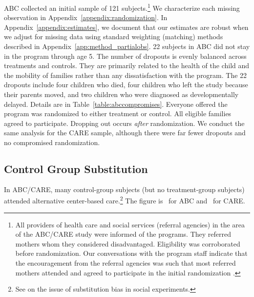 ABC collected an initial sample of 121 subjects.\footnote{All providers of health care and social services (referral agencies) in the area of the ABC/CARE study were informed of the programs. They referred mothers whom they considered disadvantaged. Eligibility was corroborated before randomization. Our conversations with the program staff indicate that the encouragement from the referral agencies was such that most referred mothers attended and agreed to participate in the initial randomization \citep{Ramey-etal_2012-ABC}.} We characterize each missing observation in Appendix~\ref{appendix:randomization}. In Appendix~\ref{appendix:estimates}, we document that our estimates are robust when we adjust for missing data using standard weighting (matching) methods described in Appendix~\ref{app:method_partialobs}. 22 subjects in ABC did not stay in the program through age 5. The number of dropouts is evenly balanced across treatments and controls. They are primarily related to the health of the child and the mobility of families rather than any dissatisfaction with the program. The 22 dropouts include four children who died, four children who left the study because their parents moved, and two children who were diagnosed as developmentally delayed. Details are in Table~\ref{table:abccompromises}. Everyone offered the program was randomized to either treatment or control. All eligible families agreed to participate. Dropping out occurs \emph{after} randomization. We conduct the same analysis for the CARE sample, although there were far fewer dropouts and no compromised randomization. 

\subsection{Control Group Substitution}

In ABC/CARE, many control-group subjects (but no treatment-group subjects) attended alternative center-based care.\footnote{See \cite{Heckman_Hohmann_etal_2000_QJE} on the issue of substitution bias in social experiments.} The figure is \treatsubsabc\ for ABC and \treatsubscarec\ for CARE. 

